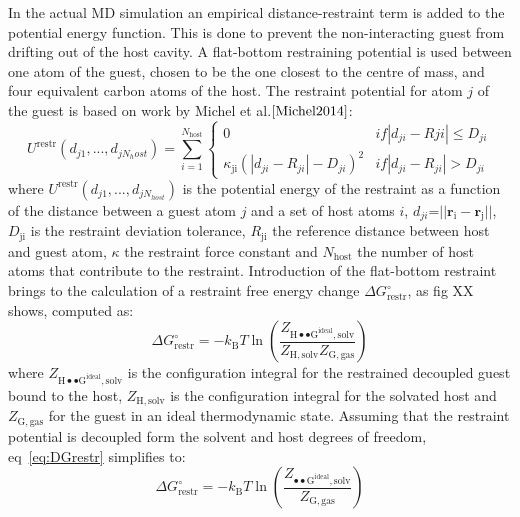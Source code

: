 \documentclass[11pt,oneside,a4paper]{article}
\begin{document}
In the actual MD simulation an empirical distance-restraint term is added to the potential energy function. This is done to prevent the non-interacting guest from drifting out of the host cavity. A flat-bottom restraining potential is used between one atom of the guest, chosen to be the one closest to the centre of mass, and four equivalent carbon atoms of the host. The restraint potential for atom $j$ of the guest is based on work by Michel et al.$\cite{Michel2014}$:
\begin{equation}
 \label{eq:restraint}
 U^{\mathrm{restr}}(d_{j1},...,d_{jN_host}) = \sum_{i=1}^{N_{\mathrm{host}}}
\begin{cases}
0  & if |d_{ji} - R{ji}| \le D_{ji}\\
\kappa_{\mathrm{ji}} (|d_{ji} -R_{ji}| - D_{ji} )^2  & if |d_{ji} - R_{ji}| > D_{ji}
\end{cases}
\end{equation}
where $U^{\mathrm{restr}}(d_{j1},...,d_{jN_{host}})$ is the potential energy of the restraint as a function of the distance between a guest atom $j$ and a set of host atoms $i$, $d_{ji}$=$|| \mathbf{r_{\mathrm{i}}} - \mathbf{r_{\mathrm{j}}} ||$, $D_{\mathrm{ji}}$ is the restraint deviation tolerance, $R_{\mathrm{ji}}$ the reference distance between host and guest atom, $\kappa$ the restraint force constant and $N_{\mathrm{host}}$ the number of host atoms that contribute to the restraint. Introduction of the flat-bottom restraint brings to the calculation of a restraint free energy change  $\Delta G^{\circ}_{\mathrm{restr}}$, as fig XX shows, computed as:
\begin{equation}
 \label{eq:DGrestr}
 \Delta G_{\mathrm{restr}}^{\circ} = -k_{\mathrm{B}}T\ln \left ( \frac{Z_{\mathrm{H\bullet\bullet G^{\mathrm{ideal}},solv}} }{Z_{\mathrm{H,solv}}Z_{\mathrm{G,gas}}} \right )
\end{equation}
where $Z_{\mathrm{H\bullet\bullet G^{\mathrm{ideal}}, solv}}$ is the configuration integral for the restrained decoupled guest bound to the host, $Z_{\mathrm{H,solv}}$ is the configuration integral for the solvated host and $Z_{\mathrm{G,gas}}$ for the guest in an ideal thermodynamic state. Assuming that the restraint potential is decoupled form the solvent and host degrees of freedom, eq~\ref{eq:DGrestr} simplifies to:
\begin{equation}
 \label{eq:DGrestrcomp}
 \Delta G_{\mathrm{restr}}^{\circ} = -k_{\mathrm{B}}T\ln \left (
 \frac{Z_{\mathrm{\bullet\bullet G^{\mathrm{ideal}},solv}}}{Z_\mathrm{G,gas}}
 \right )
\end{equation}
\end{document}
